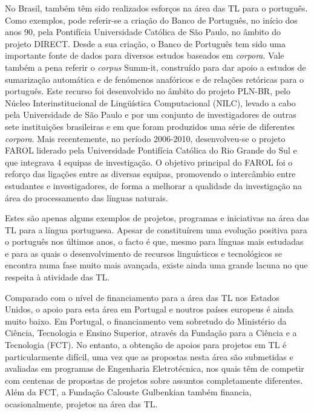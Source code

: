 \begin{multicols}{2}
No Brasil, também têm sido realizados esforços na área das TL para o português. Como exemplos, pode referir-se a criação do Banco de Português, no início dos anos 90, pela Pontifícia Universidade Católica de São Paulo, no âmbito do projeto DIRECT. Desde a sua criação, o Banco de Português tem sido uma importante fonte de dados para diversos estudos baseados em \textit{corpora}. Vale também a pena referir o \textit{corpus} Summ-it, construído para dar apoio a estudos de sumarização automática e de fenómenos anafóricos e de relações retóricas para o português. Este recurso foi desenvolvido no âmbito do projeto PLN-BR, pelo Núcleo Interinstitucional de Lingüística Computacional (NILC), levado a cabo pela Universidade de São Paulo e por um conjunto de investigadores de outras sete instituições brasileiras e em que foram produzidos uma série de diferentes \textit{corpora}. Mais recentemente, no período 2006-2010, desenvolveu-se o projeto FAROL liderado pela Universidade Pontifícia Católica do Rio Grande do Sul e que integrava 4 equipas de investigação. O objetivo principal do FAROL foi o reforço das ligações entre as diversas equipas, promovendo o intercâmbio entre estudantes e investigadores, de forma a melhorar a qualidade da investigação na área do processamento das línguas naturais.

Estes são apenas alguns exemplos de projetos, programas e iniciativas na área das TL para a língua portuguesa. Apesar de constituírem uma evolução positiva para o português nos últimos anos, o facto é que, mesmo para línguas mais estudadas e para as quais o desenvolvimento de recursos linguísticos e tecnológicos se encontra numa fase muito mais avançada, existe ainda uma grande lacuna no que res\-pei\-ta à atividade das TL.

Comparado com o nível de financiamento para a área das TL nos Estados Unidos, o apoio para esta área em Portugal e noutros países europeus é ainda muito baixo. Em Portugal, o financiamento vem sobretudo do Ministério da Ciência, Tecnologia e Ensino Superior, através da Fundação para a Ciência e a Tecnologia (FCT). No entanto, a obtenção de apoios para projetos em TL é particularmente difícil, uma vez que as propostas nesta área são submetidas e avaliadas em programas de Engenharia Eletrotécnica, nos quais têm de competir com centenas de propostas de projetos sobre assuntos completamente diferentes. Além da FCT, a Fundação Calouste Gulbenkian também financia, ocasionalmente, projetos na área das TL.


\end{multicols}
